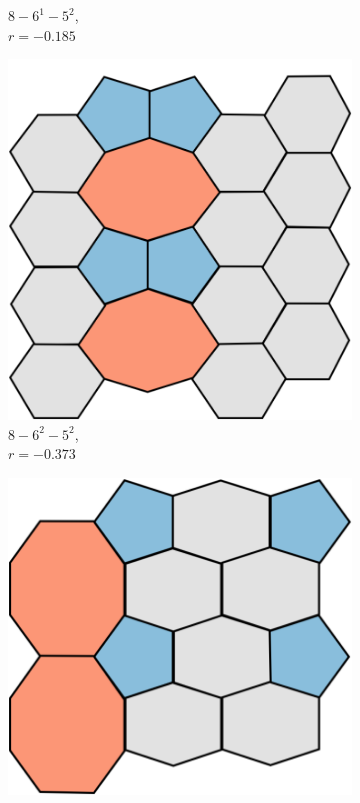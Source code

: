 \begin{figure}[h!]
\begin{subfigure}[b]{0.15\textwidth}
         \caption{$8 - 6^1 - 5^2$, \\$r=-0.185$}
         \label{appfig:86152}
     \end{subfigure}
     \hfill
      \begin{subfigure}[b]{0.15\textwidth}
         \centering
         \includegraphics[width=\textwidth]{./appendices/figures/crystal_8_62_52.pdf}
         \caption{$8 - 6^2 - 5^2$, \\$r=-0.373$}
         \label{appfig:86252}
     \end{subfigure}
     \hfill
      \begin{subfigure}[b]{0.15\textwidth}
         \centering
         \includegraphics[width=\textwidth]{./appendices/figures/crystal_8_63_52.pdf}

\end{subfigure}
\end{figure}
